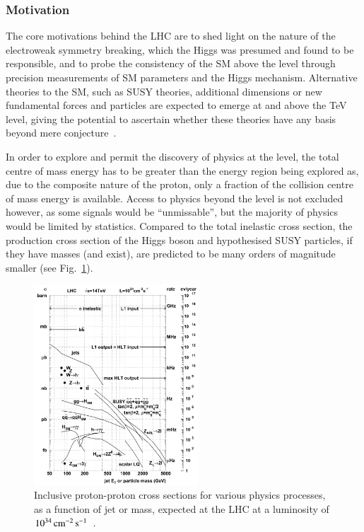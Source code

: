 \subsubsection{Motivation}
The core motivations behind the LHC are to shed light on the nature of the electroweak symmetry breaking, which the Higgs was presumed and found to be responsible, and to probe the consistency of the SM above the \TeV level through precision measurements of SM parameters and the Higgs mechanism.
Alternative theories to the SM, such as SUSY theories, additional dimensions or new fundamental forces and particles are expected to emerge at and above the TeV level, giving the potential to ascertain whether these theories have any basis beyond mere conjecture~\cite{Bayatian:2006zz}.

In order to explore and permit the discovery of physics at the \TeV level, the total centre of mass energy has to be greater than the energy region being explored as, due to the composite nature of the proton, only a fraction of the collision centre of mass energy is available.
Access to physics beyond the \TeV level is not excluded	however, as some signals would be ``unmissable'', but the majority of physics would be limited by statistics.
Compared to the total inelastic cross section, the production cross section of the Higgs boson and hypothesised SUSY particles, if they have \TeV masses (and exist), are predicted to be many orders of magnitude smaller (see Fig.~\ref{fig:crossSections}).

\begin{figure}[htbp]
\begin{center}
\includegraphics[width=0.55\textwidth]{figs/cms/crossSections.pdf}
\caption{Inclusive proton-proton cross sections for various physics processes, as a function of jet \ET or mass, expected at the LHC at a luminosity of $10^{34}\,\text{cm}^\text{$-$2}\,\text{s}^\text{$-$1}$~\cite{Dasu:2000ge}.}
\label{fig:crossSections}
\end{center}
\end{figure}

